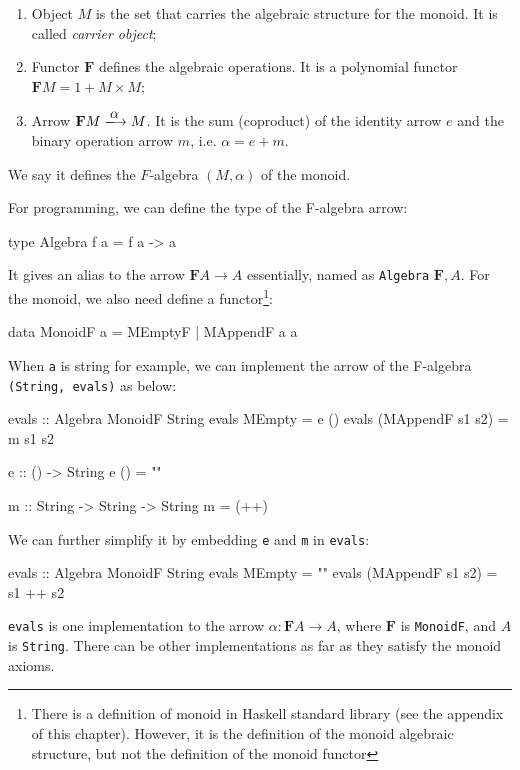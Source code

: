 \documentclass[b5paper]{article}
\begin{document}
\begin{example}
\begin{enumerate}
  \item Object $M$ is the set that carries the algebraic structure for the monoid. It is called {\em carrier object};
  \item Functor $\mathbf{F}$ defines the algebraic operations. It is a polynomial functor $\mathbf{F} M = 1 + M \times M$;
  \item Arrow $\mathbf{F} M \arrowto{\alpha} M$. It is the sum (coproduct) of the identity arrow $e$ and the binary operation arrow $m$, i.e. $\alpha = e + m$.
\end{enumerate}

We say it defines the $F$-algebra $(M, \alpha)$ of the monoid.

For programming, we can define the type of the F-algebra arrow:

\begin{Haskell}
type Algebra f a = f a -> a
\end{Haskell}

It gives an alias to the arrow $\mathbf{F}A \to A$ essentially, named as \texttt{Algebra} $\mathbf{F}, A$. For the monoid, we also need define a functor\footnote{There is a definition of monoid in Haskell standard library (see the appendix of this chapter). However, it is the definition of the monoid algebraic structure, but not the definition of the monoid functor}:

\begin{Haskell}
data MonoidF a = MEmptyF | MAppendF a a
\end{Haskell}

When \texttt{a} is string for example, we can implement the arrow of the F-algebra \texttt{(String, evals)} as below:

\begin{Haskell}
evals :: Algebra MonoidF String
evals MEmpty = e ()
evals (MAppendF s1 s2) = m s1 s2

e :: () -> String
e () = ""

m :: String -> String -> String
m = (++)
\end{Haskell}

We can further simplify it by embedding \texttt{e} and \texttt{m} in \texttt{evals}:

\begin{Haskell}
evals :: Algebra MonoidF String
evals MEmpty = ""
evals (MAppendF s1 s2) = s1 ++ s2
\end{Haskell}

\texttt{evals} is one implementation to the arrow $\alpha : \mathbf{F}A \to A$, where $\mathbf{F}$ is \texttt{MonoidF}, and $A$ is \texttt{String}. There can be other implementations as far as they satisfy the monoid axioms.
\end{example}
\end{document}
